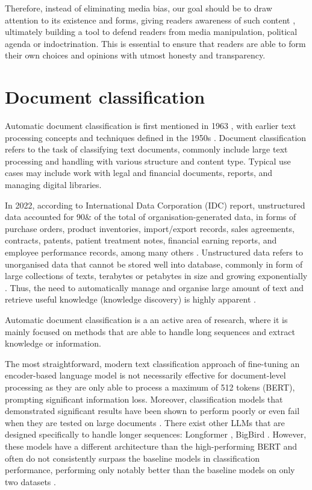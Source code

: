 Therefore, instead of eliminating media bias, our goal should be to draw attention to its existence and forms, giving readers awareness of such content \cite{spinde-2024-taxonomy}, ultimately building a tool to defend readers from media manipulation, political agenda or indoctrination. This is essential to ensure that readers are able to form their own choices and opinions with utmost honesty and transparency.

\section{Document classification}

Automatic document classification is first mentioned in 1963 \cite{borko-1963-auto-doc-classification}, with earlier text processing concepts and techniques defined in the 1950s \cite{luhn-1958-business-intelligence-system}. Document classification refers to the task of classifying text documents, commonly include large text processing and handling with various structure and content type. Typical use cases may include work with legal and financial documents, reports, and managing digital libraries.

In 2022, according to International Data Corporation (IDC) report, unstructured data accounted for 90\& of the total of organisation-generated data, in forms of purchase orders, product inventories, import/export records, sales agreements, contracts, patents, patient treatment notes, financial earning reports, and employee performance records, among many others \cite{box-2023-untapped}. Unstructured data refers to unorganised data that cannot be stored well into database, commonly in form of large collections of texts, terabytes or petabytes in size and growing exponentially \cite{mishra-2017-structured-unstructured}. Thus, the need to automatically manage and organise large amount of text and retrieve useful knowledge (knowledge discovery) is highly apparent \cite{mali-2021-relevance-of-preprocessing}.

Automatic document classification is a an active area of research, where it is mainly focused on methods that are able to handle long sequences and extract knowledge or information.

The most straightforward, modern text classification approach of fine-tuning an encoder-based language model is not necessarily effective for document-level processing as they are only able to process a maximum of 512 tokens (BERT), prompting significant information loss. Moreover, classification models that demonstrated significant results have been shown to perform poorly or even fail when they are tested on large documents \cite{wan-2019-long-length}. There exist other LLMs that are designed specifically to handle longer sequences: Longformer \cite{beltagy-2020-longformer}, BigBird \cite{zaheer-2021-bigbird}. However, these models have a different architecture than the high-performing BERT and often do not consistently surpass the baseline models in classification performance, performing only  notably better than the baseline models on only two datasets \cite{park-2022-efficient}.

